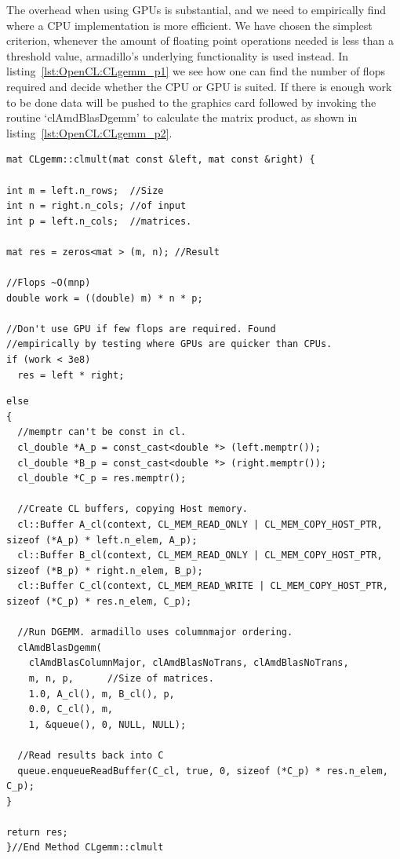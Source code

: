 The overhead when using GPUs is substantial, and we need to empirically find where a CPU implementation is more efficient.
We have chosen the simplest criterion, whenever the amount of floating point operations needed is less than a threshold value, armadillo's underlying functionality is used instead.
In listing~\ref{lst:OpenCL:CLgemm_p1} we see how one can find the number of flops required and decide whether the CPU or GPU is suited.
If there is enough work to be done data will be pushed to the graphics card followed by invoking the routine `clAmdBlasDgemm' to calculate the matrix product, as shown in listing~\ref{lst:OpenCL:CLgemm_p2}.

\begin{lstlisting}[float,label={lst:OpenCL:CLgemm_p1},caption={CLgemm multiplication implementation.},name={CLgemm}]
mat CLgemm::clmult(mat const &left, mat const &right) {

int m = left.n_rows;  //Size 
int n = right.n_cols; //of input
int p = left.n_cols;  //matrices.

mat res = zeros<mat > (m, n); //Result

//Flops ~O(mnp)
double work = ((double) m) * n * p;

//Don't use GPU if few flops are required. Found 
//empirically by testing where GPUs are quicker than CPUs.
if (work < 3e8)
  res = left * right;
\end{lstlisting}
\begin{lstlisting}[float,label={lst:OpenCL:CLgemm_p2},caption={CLgemm multiplication implementation. Continuation of listing~\ref{lst:OpenCL:CLgemm_p1}},name={CLgemm}]    
else
{
  //memptr can't be const in cl.
  cl_double *A_p = const_cast<double *> (left.memptr());
  cl_double *B_p = const_cast<double *> (right.memptr());
  cl_double *C_p = res.memptr();
  
  //Create CL buffers, copying Host memory.
  cl::Buffer A_cl(context, CL_MEM_READ_ONLY | CL_MEM_COPY_HOST_PTR, sizeof (*A_p) * left.n_elem, A_p);
  cl::Buffer B_cl(context, CL_MEM_READ_ONLY | CL_MEM_COPY_HOST_PTR, sizeof (*B_p) * right.n_elem, B_p);
  cl::Buffer C_cl(context, CL_MEM_READ_WRITE | CL_MEM_COPY_HOST_PTR, sizeof (*C_p) * res.n_elem, C_p);
 
  //Run DGEMM. armadillo uses columnmajor ordering.
  clAmdBlasDgemm( 
    clAmdBlasColumnMajor, clAmdBlasNoTrans, clAmdBlasNoTrans,
    m, n, p,      //Size of matrices.
    1.0, A_cl(), m, B_cl(), p,
    0.0, C_cl(), m,
    1, &queue(), 0, NULL, NULL);
  
  //Read results back into C
  queue.enqueueReadBuffer(C_cl, true, 0, sizeof (*C_p) * res.n_elem, C_p); 
}

return res;
}//End Method CLgemm::clmult
\end{lstlisting}








